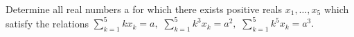 Determine all real numbers a for which there exists positive reals $x_{1}, \ldots, x_{5}$ which satisfy the relations $ \sum_{k=1}^{5} kx_{k}=a,$ $ \sum_{k=1}^{5} k^{3}x_{k}=a^{2},$ $ \sum_{k=1}^{5} k^{5}x_{k}=a^{3}.$